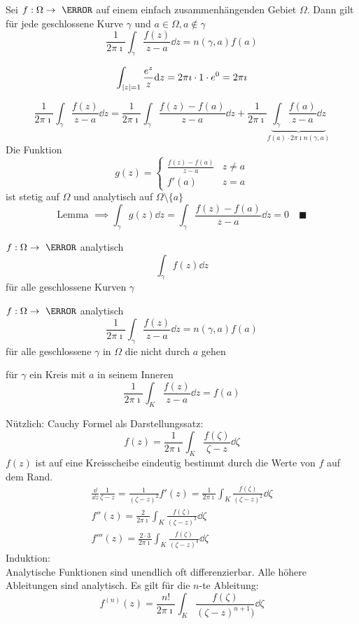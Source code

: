 \begin{satz*}[note = Cauchy-Integralformel , index = Cauchy Integralformel , indexformat = {1!~-2}]
	Sei $f: \Omega \rightarrow \C$ auf einem einfach zusammenhängenden Gebiet $\Omega$. Dann gilt für jede geschlossene Kurve $\gamma$ und $a \in \Omega , a \notin \gamma$
	\[ \frac{1}{2\pi\imath} \int_\gamma \frac{f(z)}{z-a} \dd z = n(\gamma,a) f(a) \]
\end{satz*}
\begin{bsp*}
	\[ \int_{\abs{z}=1} \frac{e^z}{z} \dd z = 2\pi\imath \cdot 1 \cdot e^0 = 2\pi\imath \]
\end{bsp*}
\begin{bew}
	\[ \frac{1}{2\pi\imath} \int_\gamma \frac{f(z)}{z-a} \dd z = \frac{1}{2\pi\imath} \int_\gamma \frac{f(z) - f(a)}{z-a} \dd z + \frac{1}{2\pi\imath} \underbrace{\int_\gamma \frac{f(a)}{z-a} \dd z}_{f(a) \cdot 2\pi\imath n(\gamma,a)} \]
	Die Funktion
	\[ g(z) = \begin{cases}
		\frac{f(z) - f(a)}{z-a} &z \neq a \\
		f'(a) &z =a
	\end{cases} \]
	ist stetig auf $\Omega$ und analytisch auf $\Omega \setminus \{ a \}$ \\
	\[ \text{Lemma } \implies \int_\gamma g(z) \dd z = \int_\gamma \frac{f(z) - f(a)}{z-a} \dd z = 0 \quad \blacksquare \]
\end{bew}
\begin{satz*}[note = Satz von Cauchy , index = Satz von Cauchy , indexformat = {3!12~ 1!~23}]
	$f: \Omega \rightarrow \C$ analytisch
	\[ \int_\gamma f(z) \dd z \]
	für alle geschlossene Kurven $\gamma$
\end{satz*}
\begin{satz*}[note = Cauchy-Integralformel , index = Cauchy Integralformel , indexformat = {1!~-2}]
	$f: \Omega \rightarrow \C$ analytisch
	\[ \frac{1}{2\pi\imath} \int_\gamma \frac{f(z)}{z-a} \dd z = n(\gamma,a) f(a) \]
	für alle geschlossene $\gamma$ in $\Omega$ die nicht durch $a$ gehen
\end{satz*}
\begin{bsp*}
	für $\gamma$ ein Kreis mit $a$ in seinem Inneren
	\[ \frac{1}{2\pi\imath} \int_K \frac{f(z)}{z-a} \dd z = f(a) \]
\end{bsp*}
Nützlich: Cauchy Formel als Darstellungssatz:
\[ f(z) = \frac{1}{2\pi\imath} \int_K \frac{f(\zeta)}{\zeta-z} \dd \zeta \]
$f(z)$ ist auf eine Kreisscheibe eindeutig bestimmt durch die Werte von $f$ auf dem Rand.
\begin{gather*}
	\frac{\dd}{\dd z} \frac{1}{\zeta - z} = \frac{1}{(\zeta - z)^2}
	f'(z) = \frac{1}{2\pi\imath} \int_K \frac{f(\zeta)}{(\zeta - z)^2} \dd \zeta \\
	f''(z) = \frac{2}{2\pi\imath} \int_K \frac{f(\zeta)}{(\zeta - z)^3} \dd \zeta \\
	f'''(z) = \frac{2 \cdot 3}{2\pi\imath} \int_K \frac{f(\zeta)}{(\zeta - z)^4} \dd \zeta
\end{gather*}
Induktion: \\
Analytische Funktionen sind unendlich oft differenzierbar. Alle höhere Ableitungen sind analytisch. Es gilt für die $n$-te Ableitung:
\[ f^{(n)}(z) = \frac{n!}{2\pi\imath} \int_K \frac{f(\zeta)}{(\zeta - z)^{n+1})} \dd \zeta \]

